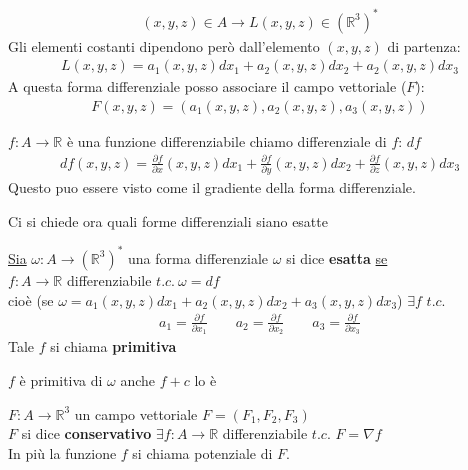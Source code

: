 \documentclass[a4paper, oneside]{article}
\begin{document}
\begin{definition}
    \begin{gather*}
        (x,y,z) \in A \longrightarrow L (x,y,z) \in (\mathbb{R}^3)^*
    \end{gather*}
    Gli elementi costanti dipendono però dall'elemento $(x,y,z)$ di partenza:
    \begin{gather*}
        L(x,y,z) = a_1(x,y,z) dx_1 + a_2(x,y,z) dx_2 + a_2(x,y,z) dx_3
    \end{gather*}
    A questa forma differenziale posso associare il campo vettoriale ($F$):
    \begin{gather*}
        F(x,y,z) = (a_1(x,y,z),a_2(x,y,z),a_3(x,y,z))
    \end{gather*}
\end{definition}
\begin{proposition}
     $f:A \to \mathbb{R}$ è una funzione differenziabile  chiamo differenziale di $f$: $df$\\
    \begin{gather*}
        df(x,y,z)  = \frac{\partial f}{\partial x}(x,y,z) dx_1 + \frac{\partial f}{\partial y}(x,y,z) dx_2 + \frac{\partial f}{\partial z}(x,y,z) dx_3
    \end{gather*}
    Questo puo essere visto come il gradiente della forma differenziale.
\end{proposition}
Ci si chiede ora quali forme differenziali siano esatte 
\begin{definition}
    \underline{Sia} $\omega:A \to (\mathbb{R}^3)^*$ una forma differenziale $\omega$ si dice \textbf{esatta} \underline{se}\\
    $f:A \to \mathbb{R}$ differenziabile $t.c. \ \omega = df$\\
    cioè (se $\omega= a_1(x,y,z)dx_1+a_2(x,y,z)dx_2+a_3(x,y,z)dx_3$)  $\exists f$ $t.c.$
    \begin{gather*}
        a_1=\frac{\partial f}{\partial x_1} \qquad a_2=\frac{\partial f}{\partial x_2} \qquad a_3=\frac{\partial f}{\partial x_3}
    \end{gather*}
    Tale $f$ si chiama \textbf{primitiva}
\end{definition}
\begin{observation}
     $f$ è primitiva di $\omega$ anche $f+c$ lo è
\end{observation}
\begin{definition}
     $F:A \to \mathbb{R}^3$ un campo vettoriale $F=(F_1,F_2,F_3)$\\
    $F$ si dice \textbf{conservativo}  $\exists f:A \to \mathbb{R}$ differenziabile $t.c.$ $F=\nabla f$\\
    In più la funzione $f$ si chiama potenziale di $F$.
\end{definition}
\end{document}
